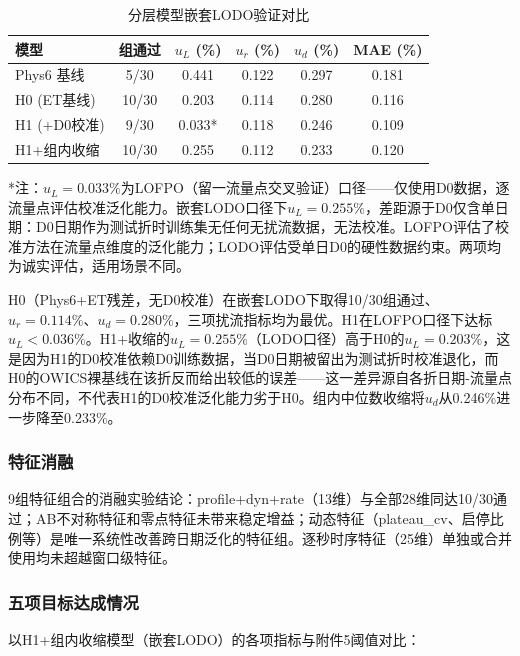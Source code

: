 \begin{table}[H]
\centering
\caption{分层模型嵌套LODO验证对比}
\label{tab:q4_comparison}
\begin{tabular}{lccccc}
\toprule
模型 & 组通过 & $u_L$ (\%) & $u_r$ (\%) & $u_d$ (\%) & MAE (\%) \\
\midrule
Phys6 基线 & 5/30 & 0.441 & 0.122 & 0.297 & 0.181 \\
H0 (ET基线) & 10/30 & 0.203 & 0.114 & 0.280 & 0.116 \\
H1 (+D0校准) & 9/30 & 0.033* & 0.118 & 0.246 & 0.109 \\
H1+组内收缩 & 10/30 & 0.255 & 0.112 & 0.233 & 0.120 \\
\bottomrule
\end{tabular}
\end{table}

*注：$u_L=0.033\%$为LOFPO（留一流量点交叉验证）口径——仅使用D0数据，逐流量点评估校准泛化能力。嵌套LODO口径下$u_L=0.255\%$，差距源于D0仅含单日期：D0日期作为测试折时训练集无任何无扰流数据，无法校准。LOFPO评估了校准方法在流量点维度的泛化能力；LODO评估受单日D0的硬性数据约束。两项均为诚实评估，适用场景不同。

H0（Phys6+ET残差，无D0校准）在嵌套LODO下取得10/30组通过、$u_r=0.114\%$、$u_d=0.280\%$，三项扰流指标均为最优。H1在LOFPO口径下达标$u_L<0.036\%$。H1+收缩的$u_L=0.255\%$（LODO口径）高于H0的$u_L=0.203\%$，这是因为H1的D0校准依赖D0训练数据，当D0日期被留出为测试折时校准退化，而H0的OWICS裸基线在该折反而给出较低的误差——这一差异源自各折日期-流量点分布不同，不代表H1的D0校准泛化能力劣于H0。组内中位数收缩将$u_d$从0.246\%进一步降至0.233\%。

\subsubsection{特征消融}

9组特征组合的消融实验结论：profile+dyn+rate（13维）与全部28维同达10/30通过；AB不对称特征和零点特征未带来稳定增益；动态特征（plateau\_cv、启停比例等）是唯一系统性改善跨日期泛化的特征组。逐秒时序特征（25维）单独或合并使用均未超越窗口级特征。

\subsubsection{五项目标达成情况}

以H1+组内收缩模型（嵌套LODO）的各项指标与附件5阈值对比：

